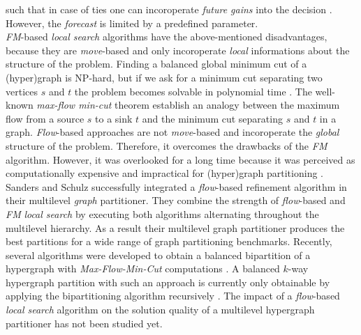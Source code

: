 such that in case of ties one can incoroperate \emph{future gains} into the decision \cite{krishnamurthy1984improved}.
However, the \emph{forecast} is limited by a predefined parameter. \\
\emph{FM}-based \emph{local search} algorithms have the above-mentioned disadvantages, because
they are \emph{move}-based and only incoroperate \emph{local} informations about the structure of the problem.
Finding a balanced global minimum cut of a (hyper)graph is NP-hard, but if we ask for a minimum
cut separating two vertices $s$ and $t$ the problem becomes solvable in polynomial time \cite{edmonds1972theoretical}.
The well-known \emph{max-flow min-cut} theorem \cite{ford1956maximal} establish an analogy
between the maximum flow from a source $s$ to a sink $t$ and the minimum cut separating
$s$ and $t$ in a graph. \emph{Flow}-based approaches are not \emph{move}-based and
incoroperate the \emph{global} structure of the problem.
Therefore, it overcomes the drawbacks of the \emph{FM} algorithm. However, it was overlooked for a long time because
it was perceived as computationally expensive and impractical for (hyper)graph partitioning
\cite{liu1998network}. \\ 
Sanders and Schulz \cite{sanders2011engineering} successfully integrated a \emph{flow}-based refinement
algorithm in their multilevel \emph{graph} partitioner. 
They combine the strength of \emph{flow}-based and \emph{FM}
\emph{local search} by executing both algorithms alternating throughout the multilevel hierarchy.
As a result their multilevel graph partitioner produces the best partitions for 
a wide range of graph partitioning benchmarks. 
Recently, several algorithms were developed to obtain a balanced bipartition of a hypergraph 
with \emph{Max-Flow-Min-Cut} computations \cite{liu1998network,patkar2004efficient,yang1996balanced}. 
A balanced $k$-way hypergraph partition with such an approach is currently only
obtainable by applying the bipartitioning algorithm recursively \cite{yang1996balanced}. 
The impact of a \emph{flow}-based \emph{local search} algorithm on the solution quality of 
a multilevel hypergraph partitioner has not been studied yet. 

